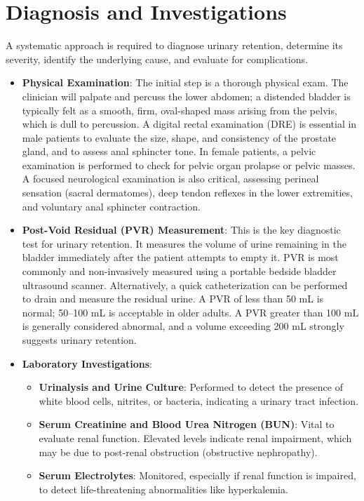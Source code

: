 \section*{Diagnosis and Investigations}
A systematic approach is required to diagnose urinary retention, determine its severity, identify the underlying cause, and evaluate for complications.
\begin{itemize}
    \item \textbf{Physical Examination}: The initial step is a thorough physical exam. The clinician will palpate and percuss the lower abdomen; a distended bladder is typically felt as a smooth, firm, oval-shaped mass arising from the pelvis, which is dull to percussion. A digital rectal examination (DRE) is essential in male patients to evaluate the size, shape, and consistency of the prostate gland, and to assess anal sphincter tone. In female patients, a pelvic examination is performed to check for pelvic organ prolapse or pelvic masses. A focused neurological examination is also critical, assessing perineal sensation (sacral dermatomes), deep tendon reflexes in the lower extremities, and voluntary anal sphincter contraction.
    \item \textbf{Post-Void Residual (PVR) Measurement}: This is the key diagnostic test for urinary retention. It measures the volume of urine remaining in the bladder immediately after the patient attempts to empty it. PVR is most commonly and non-invasively measured using a portable bedside bladder ultrasound scanner. Alternatively, a quick catheterization can be performed to drain and measure the residual urine. A PVR of less than 50 mL is normal; 50--100 mL is acceptable in older adults. A PVR greater than 100 mL is generally considered abnormal, and a volume exceeding 200 mL strongly suggests urinary retention.
    \item \textbf{Laboratory Investigations}:
    \begin{itemize}
        \item \textbf{Urinalysis and Urine Culture}: Performed to detect the presence of white blood cells, nitrites, or bacteria, indicating a urinary tract infection.
        \item \textbf{Serum Creatinine and Blood Urea Nitrogen (BUN)}: Vital to evaluate renal function. Elevated levels indicate renal impairment, which may be due to post-renal obstruction (obstructive nephropathy).
        \item \textbf{Serum Electrolytes}: Monitored, especially if renal function is impaired, to detect life-threatening abnormalities like hyperkalemia.

\end{itemize}
\end{itemize}
